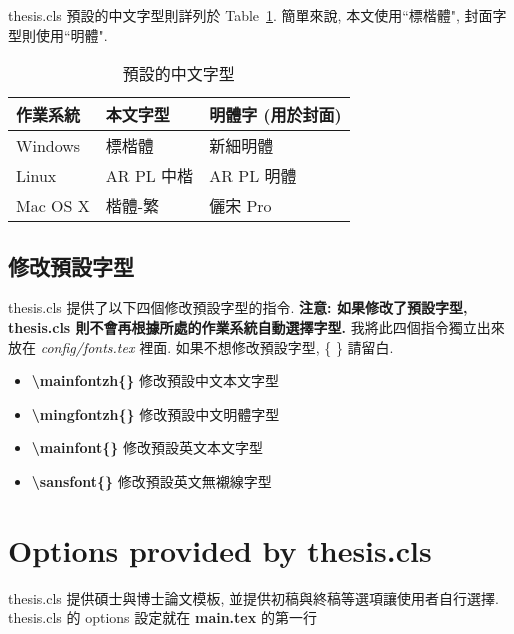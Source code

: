 thesis.cls 預設的中文字型則詳列於 Table~\ref{table:zhfonts}.
簡單來說, 本文使用``標楷體", 封面字型則使用``明體".

\begin{table}[h]
\centering
\caption[Default Chinese font settings]{預設的中文字型}
\label{table:zhfonts}
\begin{tabular}{@{}lll@{}}
\toprule
作業系統     & 本文字型     & 明體字 (用於封面) \\ \midrule
Windows  & 標楷體      & 新細明體       \\
Linux    & AR PL 中楷 & AR PL 明體   \\
Mac OS X & 楷體-繁     & 儷宋 Pro     \\ \bottomrule
\end{tabular}
\end{table}

\subsection{修改預設字型}

thesis.cls 提供了以下四個修改預設字型的指令.
\textbf{注意: 如果修改了預設字型, thesis.cls 則不會再根據所處的作業系統自動選擇字型.}
我將此四個指令獨立出來放在 \textit{config/fonts.tex} 裡面.
如果不想修改預設字型, \{ \} 請留白.

\begin{itemize}

\item \textbf{\textbackslash mainfontzh\{\}} 修改預設中文本文字型

\item \textbf{\textbackslash mingfontzh\{\}} 修改預設中文明體字型

\item \textbf{\textbackslash mainfont\{\}} 修改預設英文本文字型

\item \textbf{\textbackslash sansfont\{\}} 修改預設英文無襯線字型

\end{itemize}


\section{Options provided by thesis.cls}

thesis.cls 提供碩士與博士論文模板, 並提供初稿與終稿等選項讓使用者自行選擇.
thesis.cls 的 options 設定就在 \textbf{main.tex} 的第一行

